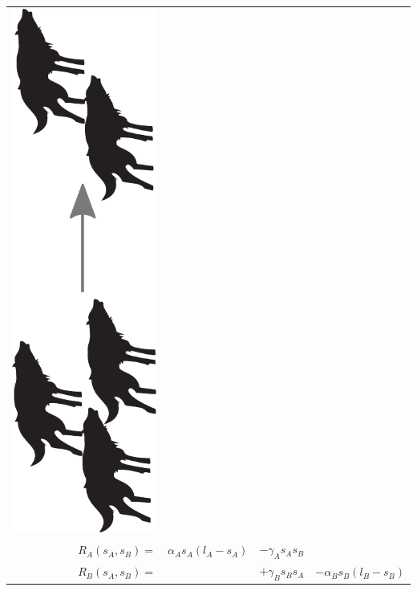 \documentclass[12pt]{beamer}
\begin{document}
\begin{frame}
\begin{tabular}{ r c c c }
      \includegraphics[scale=0.12,angle=-90]{Bilder/lv_kill.pdf}
	  \\
	  \(
		R_A(s_A,s_B)=
	  \)
	  &
	  \(
		\alpha_A s_A (l_A-s_A)
	  \)
	  &
	  \(
		- \gamma_A s_A s_B
	  \)
	  &
	  \\
	  \(
		R_B(s_A,s_B)=
	  \)
	  &
	  &
	  \(
		+ \gamma_B s_B s_A
	  \)
	  &
	  \(
		- \alpha_B s_B (l_B-s_B)
	  \)

\end{tabular}
\end{frame}
\end{document}
